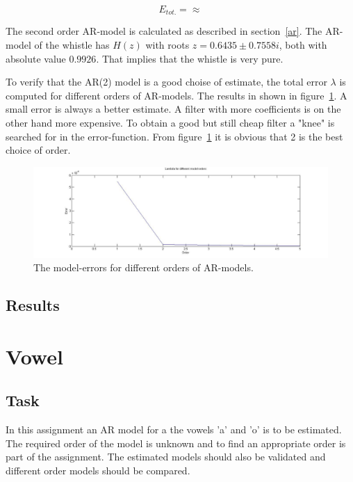 \documentclass[12pt]{article}
\begin{document}
\begin{equation}
E_{tot.} = \approx 
\end{equation}



The second order AR-model is calculated as described in section~\ref{ar}.  The AR-model of the whistle has $H(z)$ with roots $z=0.6435 \pm 0.7558i$, both with absolute value $0.9926$. That implies that the whistle is very pure. 

To verify that the AR(2) model is a good choise of estimate, the total error $\lambda$ is computed for different orders of AR-models. The results in shown in figure~\ref{whisknee}. A small error is always  a better estimate. A filter with more coefficients is on the other hand more expensive. To obtain a good but still cheap filter a "knee" is searched for in the error-function. From figure~\ref{whisknee} it is obvious that 2 is the best choice of order.   

\begin{figure}[H]
\centering
\includegraphics[width=14cm]{whistleknee.jpg}
\caption{The model-errors for different orders of AR-models.\label{whisknee}}
\end{figure}




\subsection{Results}

\section{Vowel}

\subsection{Task}
In this assignment an AR model for a the vowels 'a' and 'o' is to be estimated.
The required order of the model is unknown and to find an appropriate order is part of the assignment.
The estimated models should also be validated and different order models should be compared.
\end{document}
